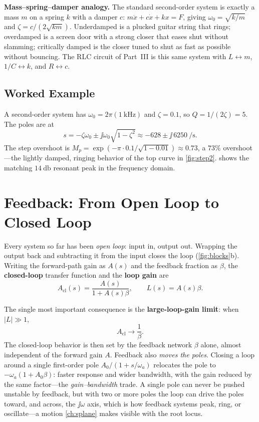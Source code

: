 \begin{physicalbox}
\textbf{Mass--spring--damper analogy.} The standard second-order system is
exactly a mass \(m\) on a spring \(k\) with a damper \(c\):
\(m\ddot{x}+c\dot{x}+kx=F\), giving \(\omega_0=\sqrt{k/m}\) and
\(\zeta=c/(2\sqrt{km})\). Underdamped is a plucked guitar string that rings;
overdamped is a screen door with a strong closer that eases shut without
slamming; critically damped is the closer tuned to shut as fast as possible
without bouncing. The RLC circuit of Part~III is this same system with
\(L\leftrightarrow m\), \(1/C\leftrightarrow k\), and \(R\leftrightarrow c\).
\end{physicalbox}

\subsection{Worked Example}
A second-order system has \(\omega_0=2\pi(\SI{1}{\kilo\hertz})\) and
\(\zeta=0.1\), so \(Q=1/(2\zeta)=5\). The poles are at
\[
s=-\zeta\omega_0\pm\jj\omega_0\sqrt{1-\zeta^2}
\approx-628\pm\jj\,6250\ \si{\per\second}.
\]
The step overshoot is \(M_p=\exp(-\pi\cdot0.1/\sqrt{1-0.01})\approx0.73\), a
\(73\%\) overshoot---the lightly damped, ringing behavior of the top curve in
\cref{fig:step2}.  shows the matching \(\SI{14}{\decibel}\)
resonant peak in the frequency domain.

\section{Feedback: From Open Loop to Closed Loop}
Every system so far has been \emph{open loop}: input in, output out. Wrapping the
output back and subtracting it from the input closes the loop
(\cref{fig:blocks}b). Writing the forward-path gain as \(A(s)\) and the feedback
fraction as \(\beta\), the \textbf{closed-loop} transfer function and the
\textbf{loop gain} are
\[
A_{\mathrm{cl}}(s)=\frac{A(s)}{1+A(s)\beta},
\qquad
L(s)=A(s)\beta .
\]

The single most important consequence is the \textbf{large-loop-gain limit}: when
\(|L|\gg1\),
\[
A_{\mathrm{cl}}\to\frac{1}{\beta}.
\]
The closed-loop behavior is then set by the feedback network \(\beta\) alone,
almost independent of the forward gain \(A\). Feedback also \emph{moves the poles}.
Closing a loop around a single first-order pole \(A_0/(1+s/\omega_a)\) relocates
the pole to \(-\omega_a(1+A_0\beta)\): faster response and wider bandwidth, with
the gain reduced by the same factor---the \emph{gain--bandwidth} trade. A single
pole can never be pushed unstable by feedback, but with two or more poles the loop
can drive the poles toward, and across, the \(\jj\omega\) axis, which is how
feedback systems peak, ring, or oscillate---a motion \cref{ch:splane} makes
visible with the root locus.

